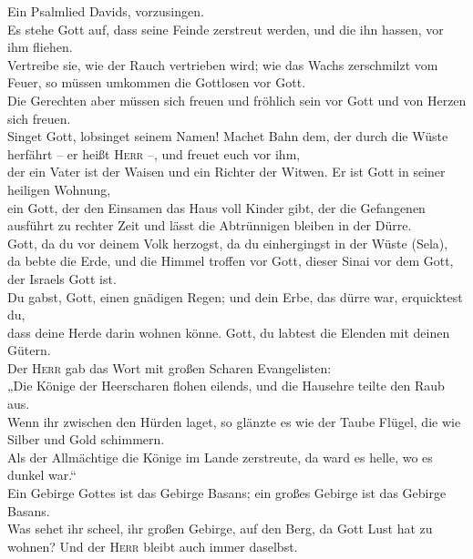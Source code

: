  Ein Psalmlied Davids, vorzusingen.\\
 Es stehe Gott auf, dass seine Feinde zerstreut werden,
und die ihn hassen, vor ihm fliehen.\\
 Vertreibe sie, wie der Rauch vertrieben wird; wie das
Wachs zerschmilzt vom Feuer, so müssen umkommen die Gottlosen vor
Gott.\\
 Die Gerechten aber müssen sich freuen und fröhlich sein
vor Gott und von Herzen sich freuen.\\
 Singet Gott, lobsinget seinem Namen! Machet Bahn dem, der
durch die Wüste herfährt -- er heißt \textsc{Herr} --, und freuet euch
vor ihm,\\
 der ein Vater ist der Waisen und ein Richter der Witwen.
Er ist Gott in seiner heiligen Wohnung,\\
 ein Gott, der den Einsamen das Haus voll Kinder gibt, der
die Gefangenen ausführt zu rechter Zeit und lässt die Abtrünnigen
bleiben in der Dürre.\\
 Gott, da du vor deinem Volk herzogst, da du einhergingst
in der Wüste (Sela),\\
 da bebte die Erde, und die Himmel troffen vor Gott,
dieser Sinai vor dem Gott, der Israels Gott ist.\\
 Du gabst, Gott, einen gnädigen Regen; und dein Erbe, das
dürre war, erquicktest du,\\
 dass deine Herde darin wohnen könne. Gott, du labtest
die Elenden mit deinen Gütern.\\
 Der \textsc{Herr} gab das Wort mit großen Scharen
Evangelisten:\\
 „Die Könige der Heerscharen flohen eilends, und die
Hausehre teilte den Raub aus.\\
 Wenn ihr zwischen den Hürden laget, so glänzte es wie
der Taube Flügel, die wie Silber und Gold schimmern.\\
 Als der Allmächtige die Könige im Lande zerstreute, da
ward es helle, wo es dunkel war.``\\
 Ein Gebirge Gottes ist das Gebirge Basans; ein großes
Gebirge ist das Gebirge Basans.\\
 Was sehet ihr scheel, ihr großen Gebirge, auf den Berg,
da Gott Lust hat zu wohnen? Und der \textsc{Herr} bleibt auch immer
daselbst.\\
